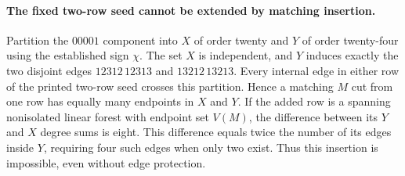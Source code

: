 \paragraph{The fixed two-row seed cannot be extended by matching insertion.}
Partition the $00001$ component into $X$ of order twenty and $Y$ of
order twenty-four using the established sign $\chi$. The set $X$ is
independent, and $Y$ induces exactly the two disjoint edges
$12312\,12313$ and $13212\,13213$.
Every internal edge in either row of the printed two-row seed crosses
this partition. Hence a matching $M$ cut from one row has equally many
endpoints in $X$ and $Y$.
If the added row is a spanning nonisolated linear forest with endpoint
set $V(M)$, the difference between its $Y$ and $X$ degree sums is eight.
This difference equals twice the number of its edges inside $Y$,
requiring four such edges when only two exist. Thus this insertion
is impossible, even without edge protection.
